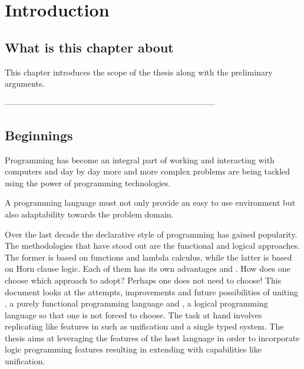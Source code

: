 \documentclass[thesis-solanki.tex]{subfiles}
\begin{document}
\chapter{Introduction}\label{chap:introduction}


\section{What is this chapter about}

This chapter introduces the scope of the thesis along with the preliminary arguments.


-----------------------------------------------------------------------------


\section{Beginnings}

Programming has become an integral part of working and interacting with computers and day by day more and more complex
problems are being tackled using the power of programming technologies.

A programming language must not only provide an easy to use environment but also adaptability towards the problem domain.

Over the last decade the declarative style of programming has gained popularity.
The methodologies that have stood out are the functional and logical approaches.
The former is based on functions and lambda calculus, while the latter is based on Horn clause logic.
Each of them has its own advantages and 
.
How does one choose which approach to adopt?
Perhaps one does not need to choose!
This document looks at the attempts, improvements and future possibilities of uniting , a purely
functional programming language and , a logical programming language so that one is not forced to
choose.
The task at hand involves replicating  like features in  such as unification and
a single typed system.
The thesis aims at leveraging the features of the host language in order to incorporate logic programming features
resulting in extending  with capabilities like unification.
\end{document}
